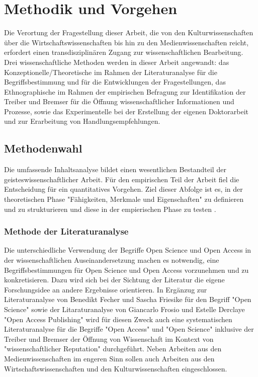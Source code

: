 \chapter{Methodik und Vorgehen}
Die Verortung der Fragestellung dieser Arbeit, die von den Kulturwissenschaften über die Wirtschaftswissenschaften bis hin zu den Medienwissenschaften reicht, erfordert einen transdisziplinären Zugang zur wissenschaftlichen Bearbeitung. Drei wissenschaftliche Methoden werden in dieser Arbeit angewandt: das Konzeptionelle/Theoretische im Rahmen der Literaturanalyse für die Begriffsbestimmung und für die Entwicklungen der Fragestellungen, das Ethnographische im Rahmen der empirischen Befragung zur Identifikation der Treiber und Bremser für die Öffnung wissenschaftlicher Informationen und Prozesse, sowie das Experimentelle bei der Erstellung der eigenen Doktorarbeit und zur Erarbeitung von Handlungsempfehlungen. 

\section{Methodenwahl}

Die umfassende Inhaltsanalyse bildet einen wesentlichen Bestandteil der geisteswissenschaftlicher Arbeit. Für den empirischen Teil der Arbeit fiel die Entscheidung für ein quantitatives Vorgehen. Ziel dieser Abfolge ist es, in der theoretischen Phase "Fähigkeiten, Merkmale und Eigenschaften" zu definieren und zu strukturieren und diese in der empierischen Phase zu testen \cite{raab_2012_fragebogen}.

\subsection{Methode der Literaturanalyse}
Die unterschiedliche Verwendung der Begriffe Open Science und Open Access in der wissenschaftlichen Auseinandersetzung machen es notwendig, eine Begriffsbestimmungen für Open Science und Open Access vorzunehmen und zu konkretisieren. Dazu wird sich bei der Sichtung der Literatur die eigene Forschungsidee an andere Ergebnisse orientieren. In Ergänzug zur Literaturanalyse von Benedikt Fecher und Sascha Friesike für den Begriff "Open Science"\cite{cite:9} sowie der Litaraturanalyse von Giancarlo Frosio und Estelle Derclaye "Open Access Publishing" \cite{CREATe_2014} wird für diesen Zweck auch eine systematischen Literaturanalyse für die Begriffe "Open Access" und "Open Science" inklusive der Treiber und Bremser der Öffnung von Wissenschaft im Kontext von "wissenschaftlicher Reputation" durchgeführt. Neben Arbeiten aus den Medienwissenschaften im engeren Sinn sollen auch Arbeiten aus den Wirtschaftswissenschaften und den Kulturwissenschaften eingeschlossen.


